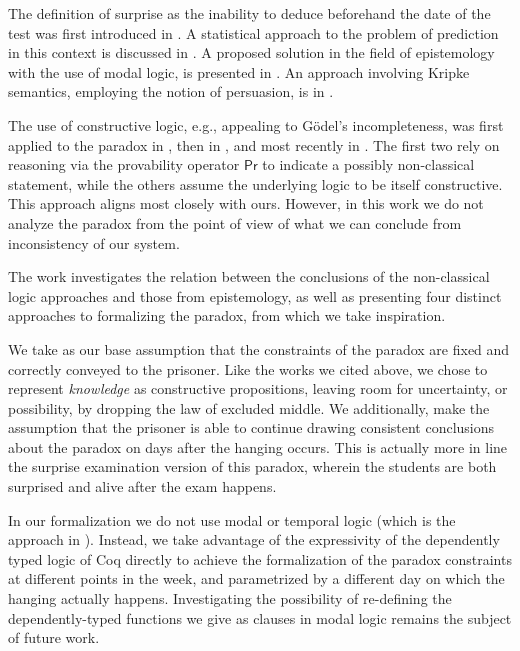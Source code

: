 \documentclass[runningheads]{llncs}
\begin{document}
The definition of surprise as the inability to deduce beforehand the date of the test
was first introduced in \cite{prediction}. A statistical approach to the problem
of prediction in this context is discussed in \cite{statistical}.
A proposed solution in the field of epistemology with the use of modal
logic, is presented in \cite{modalepistemic}. An approach involving
Kripke semantics, employing the notion of persuasion, is in \cite{kripkemodal}.

The use of constructive logic,
e.g., appealing to G\"{o}del's incompleteness, was first applied to the
paradox in \cite{goedelized}, then in \cite{godelinconsistent}, and most recently
in \cite{constructive} \cite{nonpredet}. The first two rely on reasoning via the
provability operator $\mathsf{Pr}$ to indicate
a possibly non-classical statement, while the others assume the underlying logic to be itself
constructive. This approach aligns most closely with ours.
However, in this work we do not analyze the paradox from the point of view of
what we can conclude from inconsistency of our system.

The work \cite{fourpossible} investigates the relation between the conclusions
of the non-classical logic approaches and those from epistemology, as well
as presenting four distinct approaches to formalizing the paradox, from which
we take inspiration.

We take as our base assumption that the constraints of the paradox are
fixed and correctly conveyed to the prisoner.
Like the works we cited above, we chose to represent
\emph{knowledge} as constructive propositions, leaving room for uncertainty, or possibility, by
dropping the law of excluded middle. We additionally, make the assumption that
the prisoner is able to continue drawing consistent conclusions about the paradox on days
after the hanging occurs. This is actually more in line the surprise examination version of this paradox,
wherein the students are both surprised and alive after the exam happens.

In our formalization we do not use modal or temporal logic
(which is the approach in \cite{modalepistemic}).
Instead, we take advantage of the expressivity of the dependently typed logic of Coq directly to
achieve the formalization of the paradox constraints at different points in the week,
and parametrized by a different day on which the hanging actually happens.
Investigating the possibility of re-defining the
dependently-typed functions we give as clauses in modal logic remains the subject of future work.
\end{document}
